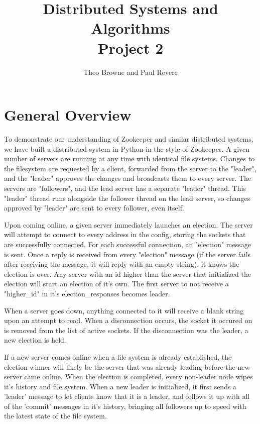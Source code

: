 \documentclass[12pt]{scrartcl}
\begin{document}
	\title{Distributed Systems and Algorithms\\Project 2}
	\author{Theo Browne and Paul Revere}
	\date{\vspace{-5ex}}

	\maketitle



	\section*{General Overview}

	To demonstrate our understanding of Zookeeper and similar distributed systems, we have built a distributed system in Python in the style of Zookeeper. A given number of servers are running at any time with identical file systems. Changes to the filesystem are requested by a client, forwarded from the server to the "leader", and the "leader" approves the changes and broadcasts them to every server. The servers are "followers", and the lead server has a separate "leader" thread. This "leader" thread runs alongside the follower thread on the lead server, so changes approved by "leader" are sent to every follower, even itself.

	Upon coming online, a given server immediately launches an election. The server will attempt to connect to every address in the config, storing the sockets that are successfully connected. For each successful connection, an "election" message is sent. Once a reply is received from every "election" message (if the server fails after receiving the message, it will reply with an empty string), it knows the election is over. Any server with an id higher than the server that initialized the election will start an election of it's own. The first server to not receive a "higher\_id" in it's election\_responses becomes leader. 

	When a server goes down, anything connected to it will receive a blank string upon an attempt to read. When a disconnection occurs, the socket it occured on is removed from the list of active sockets. If the disconnection was the leader, a new election is held.

	If a new server comes online when a file system is already established, the election winner will likely be the server that was already leading before the new server came online. When the election is completed, every non-leader node wipes it's history and file system. When a new leader is initialized, it first sends a 'leader' message to let clients know that it is a leader, and follows it up with all of the 'commit' messages in it's history, bringing all followers up to speed with the latest state of the file system.
\end{document}
